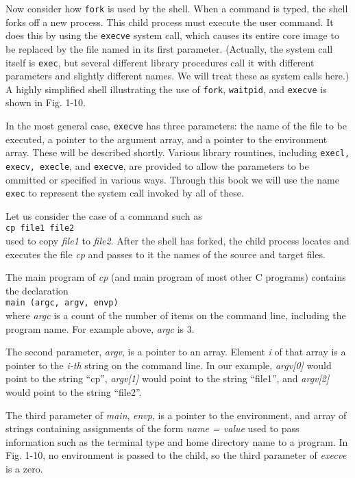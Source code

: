 \documentclass{book}
\newcommand {\sys} [1] {\textsl{#1}}
\newcommand {\cmd} [1] {\texttt{#1}}
\begin{document}
Now consider how \cmd{fork} is used by the shell.
When a command is typed, the shell forks off a new process.
This child process must execute the user command.
It does this by using the \cmd{execve} system call, which causes its entire core image to be replaced by the file named in its first parameter.
(Actually, the system call itself is \cmd{exec}, 
but several different library procedures call it with different parameters and slightly different names. 
We will treat these as system calls here.)
A highly simplified shell illustrating the use of \cmd{fork}, \cmd{waitpid}, and \cmd{execve} is shown in Fig. 1-10.

In the most general case, \cmd{execve} has three parameters: the name of the file to be executed, 
a pointer to the argument array, and a pointer to the environment array.
These will be described shortly.
Various library rountines, including \cmd{execl, execv, execle}, and \cmd{execve}, 
are provided to allow the parameters to be ommitted or specified in various ways.
Through this book we will use the name \cmd{exec} to represent the system call invoked by all of these.

Let us consider the case of a command such as\\
\cmd{cp file1 file2}\\
used to copy \sys{file1} to \sys{file2}.
After the shell has forked, the child process locates and executes the file \sys{cp} and passes to it the names of the source and target files.

The main program of \sys{cp} (and main program of most other C programs) contains the declaration\\
\cmd{main (argc, argv, envp)}\\
where \sys{argc} is a count of the number of items on the command line, including the program name.
For example above, \sys{argc} is 3.

The second parameter, \sys{argv}, is a pointer to an array.
Element \sys{i} of that array is a pointer to the \sys{i-th} string on the command line.
In our example, \sys{argv[0]} would point to the string ``cp'', \sys{argv[1]} would point to the string ``file1'', 
and \sys{argv[2]} would point to the string ``file2''.

The third parameter of \sys{main}, \sys{envp}, is a pointer to the environment, and array of strings containing assignments 
of the form \sys{name = value} used to pass information such as the terminal type and home directory name to a program.
In Fig. 1-10, no environment is passed to the child, so the third parameter of \sys{execve} is a zero.
\end{document}
